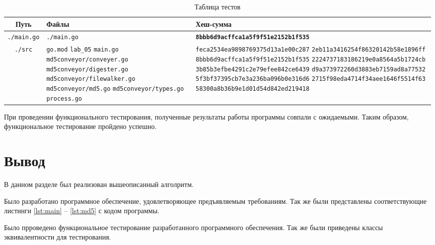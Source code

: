 \begin{table}[ht]
	\small
	\begin{center}
		\caption{Таблица тестов}
		\label{tbl:tests}
		\begin{tabular}{|c|p{50mm}|p{70mm}|}
			\hline
			\bfseries Путь & \bfseries Файлы & \bfseries Хеш-сумма \\ \hline
			\texttt{./main.go} & \texttt{./main.go} & \bfseries \texttt{8bbb6d9acffca1a5f9f51e2152b1f535} \\ \hline
			\texttt{./src} & \texttt{go.mod} \newline \texttt{lab\_05} \newline \texttt{main.go} \newline \texttt{md5conveyor/conveyer.go} \newline \texttt{md5conveyor/digester.go} \newline \texttt{md5conveyor/filewalker.go} \newline \texttt{md5conveyor/md5.go} \newline \texttt{md5conveyor/types.go} \newline \texttt{process.go} & 
			\texttt{feca2534ea9898769375d13a1e00c287} \newline \texttt{2eb11a3416254f86320142b58e1896ff} \newline \texttt{8bbb6d9acffca1a5f9f51e2152b1f535} \newline \texttt{2224737183186219e0a8564a5b1724cb} \newline \texttt{3b85b3efbe4291c2e79efee842ce6439} \newline \texttt{d9a373972260d3883eb7159ad8a77532} \newline \texttt{5f3bf37395cb7e3a236ba096b0e316d6} \newline \texttt{2715f98eda4714f34aee1646f5514f63} \newline \texttt{58300a8b36b9e1d01d54d842ed219418}
			\\\hline
		\end{tabular}
	\end{center}
\end{table}

При проведении функционального тестирования, полученные результаты работы программы совпали с ожидаемыми. Таким образом, функциональное тестирование пройдено успешно.

\section{Вывод}

В данном разделе был реализован вышеописанный алголритм. 

Было разработано программное обеспечение, удовлетворяющее предъявляемым требованиям. Так же были представлены соответствующие листинги \ref{lst:main} -- \ref{lst:md5} с кодом программы.

Было прроведено функциональное тестирование разработанного программного обеспечения. Так же были приведены классы эквивалентности для тестирования.